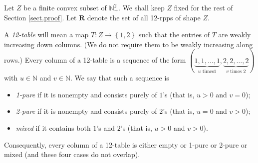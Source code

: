 \documentclass[numbers=enddot,12pt,final,onecolumn,notitlepage]{scrartcl}%
\theoremstyle{definition}
\begin{document}
Let $Z$ be a finite convex subset of $\mathbb{N}_{+}^{2}$. We shall keep $Z$
fixed for the rest of Section \ref{sect.proof}. Let $\mathbf{R}$ denote the set
of all 12-rpps of shape $Z$.

A \textit{12-table} will mean a map $T:Z\rightarrow\left\{  1,2\right\}  $
such that the entries of $T$ are weakly increasing down columns. (We do not
require them to be weakly increasing along rows.) Every column of a 12-table
is a sequence of the form $\left(  \underbrace{1,1,\ldots,1}_{u\text{ times
}1},\underbrace{2,2,\ldots,2}_{v\text{ times }2}\right)  $ with $u\in
\mathbb{N}$ and $v\in\mathbb{N}$. We say that such a sequence is

\begin{itemize}
\item \textit{1-pure} if it is nonempty and consists purely of $1$'s (that is,
$u>0$ and $v=0$);

\item \textit{2-pure} if it is nonempty and consists purely of $2$'s (that is,
$u=0$ and $v>0$);

\item \textit{mixed} if it contains both $1$'s and $2$'s (that is, $u>0$ and
$v>0$).
\end{itemize}

Consequently, every column of a 12-table is either empty or 1-pure or 2-pure
or mixed (and these four cases do not overlap).
\end{document}
